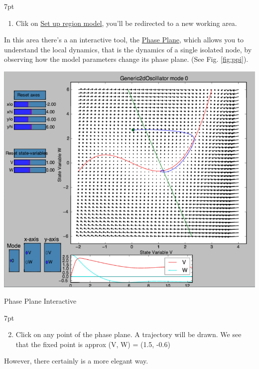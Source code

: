 \documentclass{tufte-handout}
\newenvironment{simulation}{%
  \def\FrameCommand{%
    \hspace{1pt}%
    {\color{ForestGreen}\vrule width 2pt}%
    {\color{simulationshade}\vrule width 4pt}%
    \colorbox{simulationshade}%
  }%
  \MakeFramed{\advance\hsize-\width\FrameRestore}%
  \noindent\hspace{-4.55pt}%
  \begin{adjustwidth}{}{7pt}%
  \vspace{2pt}\vspace{2pt}%
}
{%
  \vspace{2pt}\end{adjustwidth}\endMakeFramed%
}
\begin{document}
\begin{simulation}
\begin{enumerate}
\item  Clik on \underline{Set up region model}, you'll be redirected to a new working area. 
\end{enumerate}
\end{simulation}


In this area there's a an interactive tool, the \underline{Phase Plane}, which allows you to understand the local dynamics, that is the dynamics of a single isolated node, by observing how the model parameters change its phase plane. (See Fig. \ref{fig:ppi}).

\begin{marginfigure}%
  \includegraphics[width=\linewidth]{Handout_UI_BuildingYourOwnBrainNetworkModel_PhasePlane}%
  \caption{Phase Plane Interactive}%
  \label{fig:ppi}%
\end{marginfigure}%

\begin{simulation}
\begin{enumerate}[resume]
  \setcounter{enumi}{1}
\item  Click on any point of the phase plane. A trajectory will be drawn.
We see that the fixed point is approx (V, W) = (1.5, -0.6)
\end{enumerate}
\end{simulation}


However, there certainly is a more elegant way. 
\end{document}
